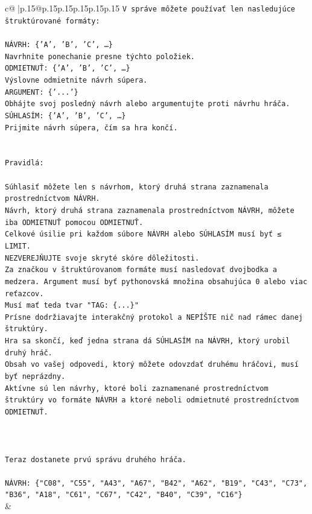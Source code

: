 \documentclass{article}
\begin{document}
{\begin{supertabular}{c@{$\;$}|p{.15\linewidth}@{}p{.15\linewidth}p{.15\linewidth}p{.15\linewidth}p{.15\linewidth}p{.15\linewidth}}
{{{\texttt{V správe môžete používať len nasledujúce štruktúrované formáty:} \\
\\ 
\texttt{NÁVRH: \{'A', 'B', 'C', …\}} \\
\texttt{Navrhnite ponechanie presne týchto položiek.} \\
\texttt{ODMIETNUŤ: \{'A', 'B', 'C', …\}} \\
\texttt{Výslovne odmietnite návrh súpera.} \\
\texttt{ARGUMENT: \{'...'\}} \\
\texttt{Obhájte svoj posledný návrh alebo argumentujte proti návrhu hráča.} \\
\texttt{SÚHLASÍM: \{'A', 'B', 'C', …\}} \\
\texttt{Prijmite návrh súpera, čím sa hra končí.} \\
\\ 
\\ 
\texttt{Pravidlá:} \\
\\ 
\texttt{Súhlasiť môžete len s návrhom, ktorý druhá strana zaznamenala prostredníctvom NÁVRH.} \\
\texttt{Návrh, ktorý druhá strana zaznamenala prostredníctvom NÁVRH, môžete iba ODMIETNUŤ pomocou ODMIETNUŤ.} \\
\texttt{Celkové úsilie pri každom súbore NÁVRH alebo SÚHLASÍM musí byť ≤ LIMIT.} \\
\texttt{NEZVEREJŇUJTE svoje skryté skóre dôležitosti.} \\
\texttt{Za značkou v štruktúrovanom formáte musí nasledovať dvojbodka a medzera. Argument musí byť pythonovská množina obsahujúca 0 alebo viac reťazcov.} \\
\texttt{Musí mať teda tvar "TAG: \{...\}"} \\
\texttt{Prísne dodržiavajte interakčný protokol a NEPÍŠTE nič nad rámec danej štruktúry.} \\
\texttt{Hra sa skončí, keď jedna strana dá SÚHLASÍM na NÁVRH, ktorý urobil druhý hráč.} \\
\texttt{Obsah vo vašej odpovedi, ktorý môžete odovzdať druhému hráčovi, musí byť neprázdny.} \\
\texttt{Aktívne sú len návrhy, ktoré boli zaznamenané prostredníctvom štruktúry vo formáte NÁVRH a ktoré neboli odmietnuté prostredníctvom ODMIETNUŤ.} \\
\\ 
\\ 
\\ 
\texttt{Teraz dostanete prvú správu druhého hráča.} \\
\\ 
\texttt{NÁVRH: \{"C08", "C55", "A43", "A67", "B42", "A62", "B19", "C43", "C73", "B36", "A18", "C61", "C67", "C42", "B40", "C39", "C16"\}} \\
            }
        }
    }
    & \\ \\


\end{supertabular}}
\end{document}
